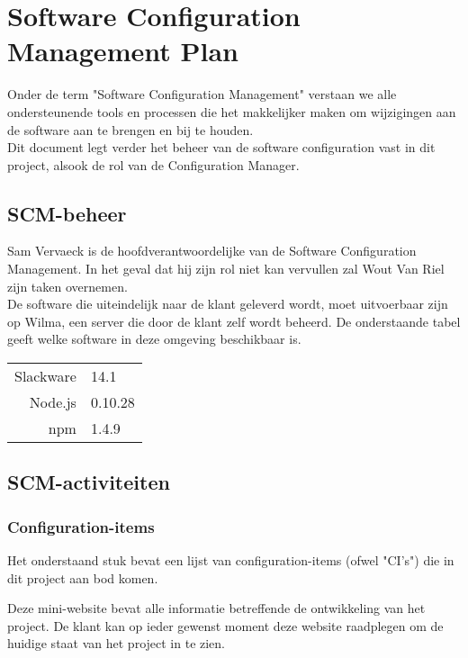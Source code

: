 

\section{Software Configuration Management Plan}

Onder de term "Software Configuration Management" verstaan we alle ondersteunende tools en processen die het makkelijker maken om wijzigingen aan de software aan te brengen en bij te houden. \\

Dit document legt verder het beheer van de software configuration vast in dit project, alsook de rol van de Configuration Manager.

\subsection{SCM-beheer}

Sam Vervaeck is de hoofdverantwoordelijke van de Software Configuration Management. In het geval dat hij zijn rol niet kan vervullen zal Wout Van Riel zijn taken overnemen. \\

De software die uiteindelijk naar de klant geleverd wordt, moet uitvoerbaar zijn op Wilma, een server die door de klant zelf wordt beheerd. De onderstaande tabel geeft welke software in deze omgeving beschikbaar is. \\

\begin{tabular}{r|l}
Slackware & 14.1 \\
Node.js & 0.10.28 \\
npm & 1.4.9
\end{tabular}

\subsection{SCM-activiteiten}

\subsubsection{Configuration-items}

Het onderstaand stuk bevat een lijst van configuration-items (ofwel "CI's") die in dit project aan bod komen.


Deze mini-website bevat alle informatie betreffende de ontwikkeling van het project. De klant kan op ieder gewenst moment deze website raadplegen om de huidige staat van het project in te zien.

